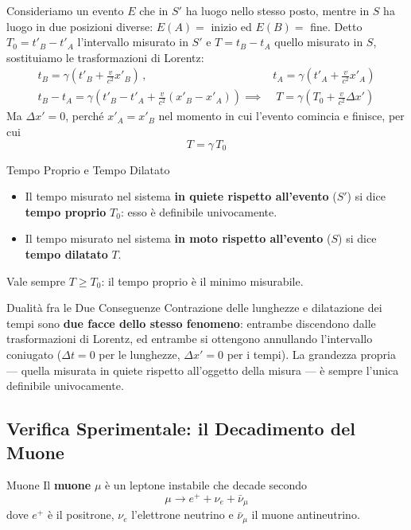 Consideriamo un evento $E$ che in $S'$ ha luogo nello stesso posto, mentre in $S$ ha luogo in due posizioni diverse: $E(A) = $ inizio ed $E(B) = $ fine. Detto $T_0 = t'_B - t'_A$ l'intervallo misurato in $S'$ e $T = t_B - t_A$ quello misurato in $S$, sostituiamo le trasformazioni di Lorentz:
\begin{align*}
    t_B = \gamma\left(t'_B + \frac{v}{c^2}x'_B\right) \, , \qquad & t_A = \gamma\left(t'_A + \frac{v}{c^2}x'_A\right) \\
    t_B - t_A = \gamma\left(t'_B - t'_A + \frac{v}{c^2}(x'_B - x'_A)\right) \implies & \; T = \gamma\left(T_0 + \frac{v}{c^2}\Delta x'\right)
\end{align*}
Ma $\Delta x' = 0$, perché $x'_A = x'_B$ nel momento in cui l'evento comincia e finisce, per cui
\begin{equation}
    \boxed{\;T = \gamma \, T_0\;}
\end{equation}

\begin{definizione}{Tempo Proprio e Tempo Dilatato}
\begin{itemize}[leftmargin=1.4em]
    \item Il tempo misurato nel sistema \textbf{in quiete rispetto all'evento} ($S'$) si dice \textbf{tempo proprio} $T_0$: esso è definibile univocamente.
    \item Il tempo misurato nel sistema \textbf{in moto rispetto all'evento} ($S$) si dice \textbf{tempo dilatato} $T$.
\end{itemize}
Vale sempre $T \geq T_0$: il tempo proprio è il minimo misurabile.
\end{definizione}

\begin{osservazione}{Dualità fra le Due Conseguenze}
Contrazione delle lunghezze e dilatazione dei tempi sono \textbf{due facce dello stesso fenomeno}: entrambe discendono dalle trasformazioni di Lorentz, ed entrambe si ottengono annullando l'intervallo coniugato ($\Delta t = 0$ per le lunghezze, $\Delta x' = 0$ per i tempi). La grandezza propria --- quella misurata in quiete rispetto all'oggetto della misura --- è sempre l'unica definibile univocamente.
\end{osservazione}

\subsection{Verifica Sperimentale: il Decadimento del Muone}

\begin{definizione}{Muone}
Il \textbf{muone} $\mu$ è un leptone instabile che decade secondo
\begin{equation}
    \mu \longrightarrow e^{+} + \nu_e + \bar{\nu}_{\mu}
\end{equation}
dove $e^{+}$ è il positrone, $\nu_e$ l'elettrone neutrino e $\bar{\nu}_{\mu}$ il muone antineutrino.
\end{definizione}

